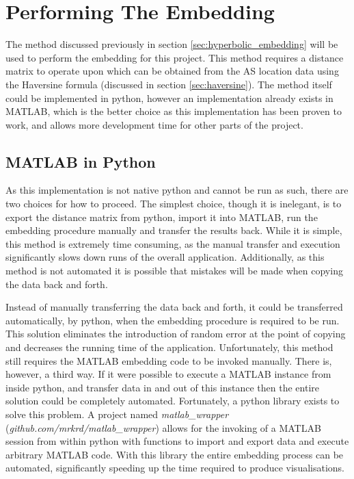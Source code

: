 \section{Performing The Embedding}

The method discussed previously in section \ref{sec:hyperbolic_embedding} will be used to perform the embedding for this project. This method requires a distance matrix to operate upon which can be obtained from the AS location data using the Haversine formula (discussed in section \ref{sec:haversine}). The method itself could be implemented in python, however an implementation already exists in MATLAB, which is the better choice as this implementation has been proven to work, and allows more development time for other parts of the project. 

\subsection{MATLAB in Python}

As this implementation is not native python and cannot be run as such, there are two choices for how to proceed. The simplest choice, though it is inelegant, is to export the distance matrix from python, import it into MATLAB, run the embedding procedure manually and transfer the results back. While it is simple, this method is extremely time consuming, as the manual transfer and execution significantly slows down runs of the overall application. Additionally, as this method is not automated it is possible that mistakes will be made when copying the data back and forth. 

Instead of manually transferring the data back and forth, it could be transferred automatically, by python, when the embedding procedure is required to be run. This solution eliminates the introduction of random error at the point of copying and decreases the running time of the application. Unfortunately, this method still requires the MATLAB embedding code to be invoked manually. There is, however, a third way. If it were possible to execute a MATLAB instance from inside python, and transfer data in and out of this instance then the entire solution could be completely automated.
Fortunately, a python library exists to solve this problem. A project named \textit{matlab\_wrapper} (\textit{github.com/mrkrd/matlab\_wrapper}) allows for the invoking of a MATLAB session from within python with functions to import and export data and execute arbitrary MATLAB code. With this library the entire embedding process can be automated, significantly speeding up the time required to produce visualisations. 

